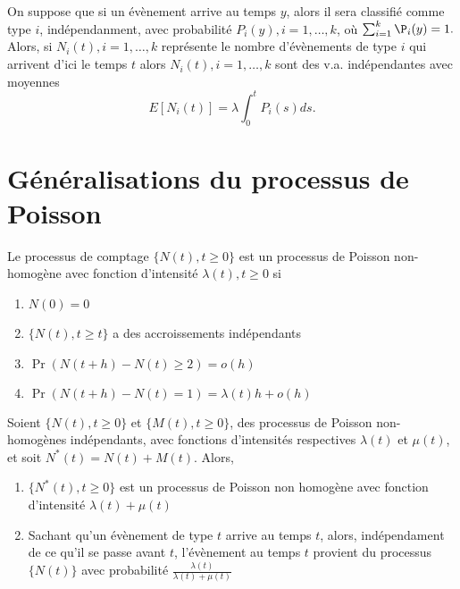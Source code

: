 \begin{proposition}{}{}
	On suppose que si un évènement arrive au temps $y$, alors il sera classifié comme type $i$, indépendanment, avec probabilité $P_i(y), i = 1, \dots, k$, où $\sum_{i = 1}^{k}\P_i(y) = 1.$ Alors, si $N_i(t), i = 1, \dots, k$ représente le nombre d'évènements de type $i$ qui arrivent d'ici le temps $t$ alors $N_i(t), i = 1, \dots, k$ sont des v.a. indépendantes avec moyennes 
	$$E[N_i(t)] = \lambda \int_{0}^{t}P_i(s) ds. $$
\end{proposition}

\section{Généralisations du processus de Poisson}

\begin{definition}{}{}
	Le processus de comptage $\{N(t), t\geq 0\}$ est un processus de Poisson non-homogène avec fonction d'intensité $\lambda(t), t\geq 0$ si 
	\begin{enumerate}
		\item $\displaystyle N(0) = 0$
		\item $\displaystyle \{N(t), t\geq t\}$ a des accroissements indépendants
		\item $\displaystyle \Pr(N(t + h) - N(t) \geq 2) = o(h)$
		\item $\displaystyle \Pr(N(t + h) - N(t) = 1) = \lambda(t) h + o(h)$
	\end{enumerate}
\end{definition}

\begin{proposition}{}{}
	Soient $\{N(t), t \geq 0\}$ et $\{M(t), t\geq 0\}$, des processus de Poisson non-homogènes indépendants, avec fonctions d'intensités respectives $\lambda(t)$ et $\mu(t)$, et soit $N^*(t) = N(t) + M(t)$. Alors, 
	\begin{enumerate}
		\item $\{N^*(t), t\geq 0\}$ est un processus de Poisson non homogène avec fonction d'intensité $\lambda(t) + \mu(t)$
		\item Sachant qu'un évènement de type $t$ arrive au temps $t$, alors, indépendament de ce qu'il se passe avant $t$, l'évènement au temps $t$ provient du processus $\{N(t)\}$ avec probabilité $\frac{\lambda(t)}{\lambda(t) + \mu(t)}$
	\end{enumerate}
\end{proposition}


